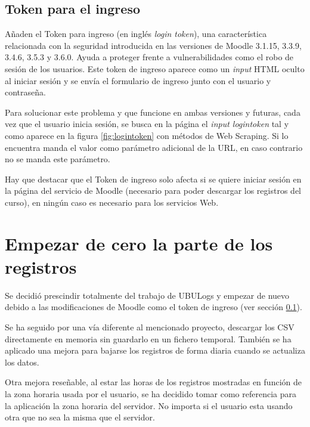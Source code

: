 \subsection{Token para el ingreso} \label{sec:logintoken}
Añaden el Token para ingreso\cite{noauthor_token_nodate} (en inglés \textit{login token}), una característica relacionada con la seguridad introducida en las versiones de Moodle 3.1.15, 3.3.9, 3.4.6, 3.5.3 y 3.6.0. Ayuda a proteger frente a vulnerabilidades como el robo de sesión de los usuarios. Este token de ingreso aparece como un \textit{input} HTML oculto\cite{noauthor_html_nodate-1} al iniciar sesión y se envía el formulario de ingreso junto con el usuario y contraseña.


Para solucionar este problema y que funcione en ambas versiones y futuras, cada vez que el usuario inicia sesión, se busca en la página el \textit{input logintoken} tal y como aparece en la figura \ref{fig:logintoken} con métodos de Web Scraping\cite{marti_que_2016}. Si lo encuentra manda el valor como parámetro adicional de la URL, en caso contrario no se manda este parámetro.

Hay que destacar que el Token de ingreso solo afecta si se quiere iniciar sesión en la página del servicio de Moodle (necesario para poder descargar los registros del curso), en ningún caso es necesario para los servicios Web.

\section{Empezar de cero la parte de los registros}

Se decidió prescindir totalmente del trabajo de UBULogs y empezar de nuevo debido a las modificaciones de Moodle como el token de ingreso (ver sección \ref{sec:logintoken}). 

Se ha seguido por una vía diferente al mencionado proyecto, descargar los CSV directamente en memoria sin guardarlo en un fichero temporal. También se ha aplicado una mejora para bajarse los registros de forma diaria cuando se actualiza los datos.

Otra mejora reseñable, al estar las horas de los registros mostradas en función de la zona horaria usada por el usuario, se ha decidido tomar como referencia para la aplicación la zona horaria del servidor. No importa si el usuario esta usando otra que no sea la misma que el servidor.

